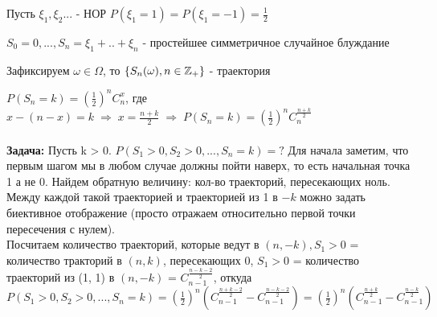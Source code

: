Пусть $\xi_1, \xi_2...$ - НОР $P(\xi_1 = 1) = P(\xi_1 = -1) = \frac{1}{2}$
\begin{definition}
$S_0 = 0, ..., S_n = \xi_1 + .. + \xi_n$ - простейшее симметричное случайное блуждание
\end{definition}
\begin{definition} Зафиксируем $\omega \in \Omega$, то
$\{S_n(\omega), n \in \mathbb{Z}_{+}\}$ - траектория
\end{definition}
$P(S_n = k) = (\frac{1}{2})^n C_n^x$,\;\; где $x - (n-x) = k \;\Rightarrow\; x = \frac{n+k}{2} \;\Rightarrow\; P(S_n = k) =(\frac{1}{2})^n C_n^{\frac{n+k}{2}}$
\\
\\
\textbf{Задача:}  Пусть k > 0. $P(S_1 > 0, S_2 > 0,..., S_n = k) = ?$
Для начала заметим, что первым шагом мы в любом случае должны пойти наверх, то есть начальная точка 1 а не 0. Найдем обратную величину: кол-во траекторий, пересекающих ноль. Между каждой такой траекторией и траекторией из 1 в $-k$ можно задать биективное отображение (просто отражаем относительно первой точки пересечения с нулем).\\ Посчитаем количество траекторий, которые ведут в $(n, -k), S_1 > 0$ = количество тракторий в  $(n, k)$, пересекающих 0, $ S_1 > 0$ =  количество траекторий из (1, 1) в  $(n, -k)$ =  $C_{n-1}^{\frac{n-k - 2}{2}}$, откуда  $P(S_1 > 0, S_2 > 0,..., S_n = k) = (\frac{1}{2})^n (C_{n-1}^{\frac{n+k-2}{2}} - C_{n-1}^{\frac{n-k-2}{2}}) = (\frac{1}{2})^n (C_{n-1}^{\frac{n+k}{2}} - C_{n-1}^{\frac{n-k}{2}})$